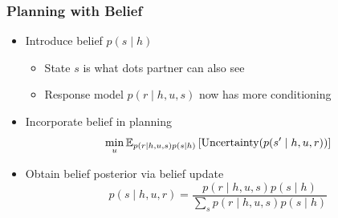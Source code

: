 \documentclass{beamer}
\begin{document}
\begin{frame}
\frametitle{Planning with Belief}
\begin{itemize}
\item Introduce belief $p(s \mid h)$
    \begin{itemize}
    \item State $s$ is what dots partner can also see
    \item Response model $p(r \mid h,u,s)$ now has more conditioning
    \end{itemize}
\begin{center}
\end{center}
\item Incorporate belief in planning
$$\min_{u} \mathbb{E}_{p(r \mid h, u, s)p(s \mid h)}\left[\text{Uncertainty}(p(s' \mid h, u, r))\right]$$
\item Obtain belief posterior via belief update
$$p(s \mid h, u, r) = \frac{p(r \mid h, u, s)p(s \mid h)}{\sum_s p(r\mid h,u,s)p(s \mid h)}$$
\end{itemize}
\end{frame}
\end{document}
